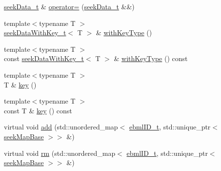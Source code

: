 \begin{DoxyCompactItemize}
\item 
\mbox{\hyperlink{classebml_1_1seekData__t}{seek\+Data\+\_\+t}} \& \mbox{\hyperlink{classebml_1_1seekData__t_a7e1b55089fe090b9c2412f140411e2c3}{operator=}} (\mbox{\hyperlink{classebml_1_1seekData__t}{seek\+Data\+\_\+t}} \&\&)
\item 
{\footnotesize template$<$typename T $>$ }\\\mbox{\hyperlink{classebml_1_1seekDataWithKey__t}{seek\+Data\+With\+Key\+\_\+t}}$<$ T $>$ \& \mbox{\hyperlink{classebml_1_1seekData__t_a1c5d23645387f0d93a078d2227893b50}{with\+Key\+Type}} ()
\item 
{\footnotesize template$<$typename T $>$ }\\const \mbox{\hyperlink{classebml_1_1seekDataWithKey__t}{seek\+Data\+With\+Key\+\_\+t}}$<$ T $>$ \& \mbox{\hyperlink{classebml_1_1seekData__t_aea1960bbf31310cf899420a7a36d5a49}{with\+Key\+Type}} () const
\item 
{\footnotesize template$<$typename T $>$ }\\T \& \mbox{\hyperlink{classebml_1_1seekData__t_a1dec5e33c576eecc5685796c28dca712}{key}} ()
\item 
{\footnotesize template$<$typename T $>$ }\\const T \& \mbox{\hyperlink{classebml_1_1seekData__t_a9a3356fbd22caa75a6df703e3e2f2ca6}{key}} () const
\item 
virtual void \mbox{\hyperlink{classebml_1_1seekData__t_a6ca62e902490d42a3dd03cfd23452016}{add}} (std\+::unordered\+\_\+map$<$ \mbox{\hyperlink{namespaceebml_a86c5f604ddf12a74aa9812e997a58691}{ebml\+I\+D\+\_\+t}}, std\+::unique\+\_\+ptr$<$ \mbox{\hyperlink{classebml_1_1seekMapBase}{seek\+Map\+Base}} $>$$>$ \&)
\item 
virtual void \mbox{\hyperlink{classebml_1_1seekData__t_a1f0da8c547bc52496bc4716ec732d138}{rm}} (std\+::unordered\+\_\+map$<$ \mbox{\hyperlink{namespaceebml_a86c5f604ddf12a74aa9812e997a58691}{ebml\+I\+D\+\_\+t}}, std\+::unique\+\_\+ptr$<$ \mbox{\hyperlink{classebml_1_1seekMapBase}{seek\+Map\+Base}} $>$$>$ \&)
\end{DoxyCompactItemize}
